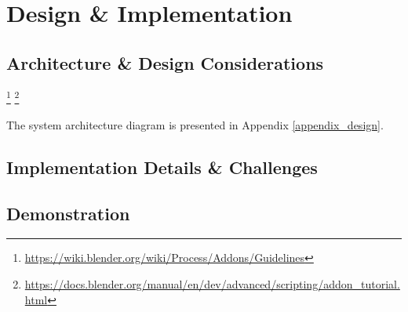 


\chapter{Design \& Implementation}\label{design_implementation}

\section{Architecture \& Design Considerations}

\footnote{\url{https://wiki.blender.org/wiki/Process/Addons/Guidelines}}
\footnote{\url{https://docs.blender.org/manual/en/dev/advanced/scripting/addon_tutorial.html}}

The system architecture diagram is presented in Appendix \ref{appendix_design}.

\section{Implementation Details \& Challenges}

\section{Demonstration}
